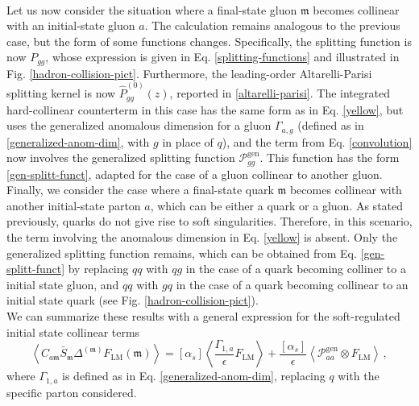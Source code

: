 \documentclass[a4paper, 12pt]{book}
\newcommand{\um}{\mathfrak{m}}
\begin{document}
\\
Let us now consider the situation where a final-state gluon $\um$ becomes collinear with an initial-state gluon $a$. The calculation remains analogous to the previous case, but the form of some functions changes. Specifically, the splitting function is now $P_{gg}$, whose expression is given in Eq. \ref{splitting-functions} and illustrated in Fig. \ref{hadron-collision-pict}. Furthermore, the leading-order Altarelli-Parisi splitting kernel is now $\hat{P}_{gg}^{(0)}(z)$, reported in \ref{altarelli-parisi}. The integrated hard-collinear counterterm in this case has the same form as in Eq. \ref{yellow}, but uses the generalized anomalous dimension for a gluon $\Gamma_{a,g}$ (defined as in \ref{generalized-anom-dim}, with $g$ in place of $q$), and the term from Eq. \ref{convolution} now involves the generalized splitting function $\mathcal{P}_{gg}^{\mathrm{gen}}$. This function has the form \ref{gen-splitt-funct}, adapted for the case of a gluon collinear to another gluon. \\

Finally, we consider the case where a final-state quark $\um$ becomes collinear with another initial-state parton $a$, which can be either a quark or a gluon. As stated previously, quarks do not give rise to soft singularities. Therefore, in this scenario, the term involving the anomalous dimension in Eq. \ref{yellow} is absent. Only the generalized splitting function remains, which can be obtained from Eq. \ref{gen-splitt-funct} by replacing $qq$ with $qg$ in the case of a quark becoming colliner to a initial state gluon, and $qq$ with $gq$ in the case of a quark becoming collinear to an initial state quark (see Fig. \ref{hadron-collision-pict}). \\

We can summarize these results with a general expression for the soft-regulated initial state collinear terms
\begin{equation}
  \left< C_{a\um} \bar{S}_\um \Delta^{(\um)} F_{\mathrm{LM}} (\um) \right> = [\alpha_s] \left< \frac{\Gamma_{1,a}}{\epsilon} F_{\mathrm{LM}} \right> + \frac{[\alpha_s]}{\epsilon}\left< \mathcal{P}_{aa}^{\mathrm{gen}} \otimes F_{\mathrm{LM}} \right> \, ,
  \label{initial-state-collinear}
\end{equation}
where $\Gamma_{1,a}$ is defined as in Eq. \ref{generalized-anom-dim}, replacing $q$ with the specific parton considered.
\end{document}
